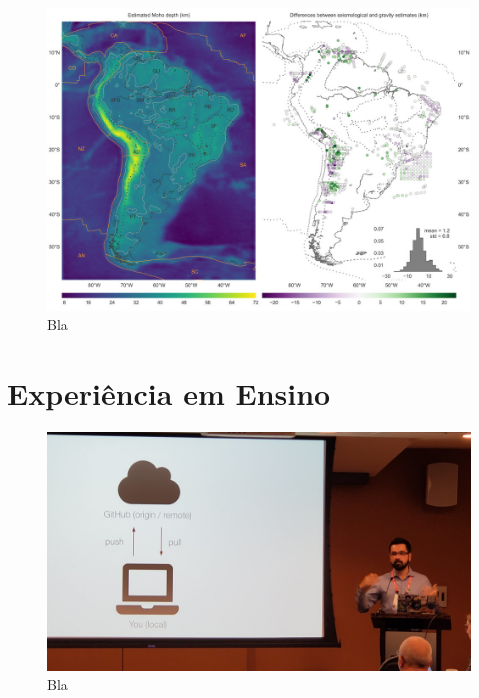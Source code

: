 \documentclass[11pt,a4paper,oneside]{book}
\begin{document}
\begin{figure}[h]
  \vspace{0.5cm}
  \begin{center}
    \includegraphics[width=\textwidth]{images/south-american-moho.jpg}
  \end{center}
  \caption{
    Bla
  }
\end{figure}

\chapter{Experiência em Ensino}

\begin{figure}[h]
  \vspace{0.5cm}
  \begin{center}
    \includegraphics[width=\textwidth]{images/agu-2019-git-lesson.jpg}
  \end{center}
  \caption{
    Bla
  }
\end{figure}
\end{document}
